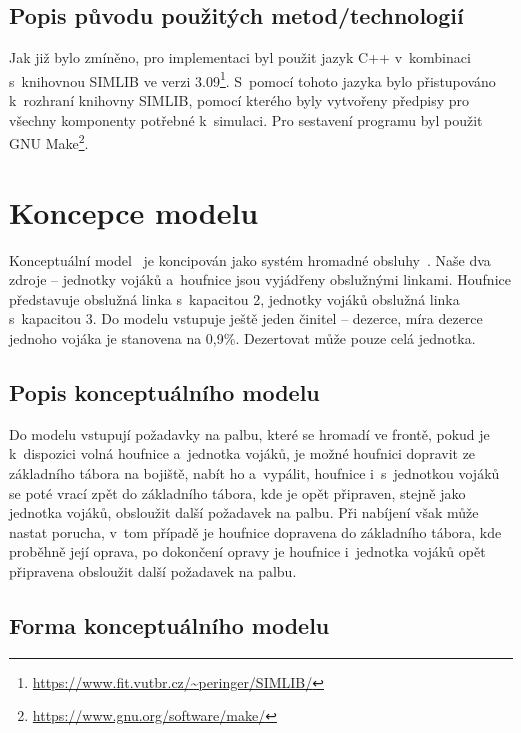 \documentclass[a4paper]{article}
\begin{document}
        \subsection{Popis původu použitých metod/technologií}
        \label{subsec:techology}

            Jak již bylo zmíněno, pro implementaci byl použit jazyk C++ v~kombinaci s~knihovnou SIMLIB ve verzi 3.09\footnote{\url{https://www.fit.vutbr.cz/~peringer/SIMLIB/}}. S~pomocí tohoto jazyka
            bylo přistupováno k~rozhraní knihovny SIMLIB, pomocí kterého byly vytvořeny předpisy pro všechny komponenty potřebné k~simulaci.
            Pro sestavení programu byl použit GNU Make\footnote{\url{https://www.gnu.org/software/make/}}.

    \section{Koncepce modelu}
    \label{sec:concept}

        Konceptuální model~\cite[snímek 48]{IMS_slides} je koncipován jako systém hromadné obsluhy~\cite[snímek 136]{IMS_slides}.
        Naše dva zdroje -- jednotky vojáků a~houfnice jsou vyjádřeny obslužnými linkami. Houfnice představuje obslužná linka s~kapacitou 2,
        jednotky vojáků obslužná linka s~kapacitou 3. Do modelu vstupuje ještě jeden činitel -- dezerce, míra dezerce jednoho vojáka je stanovena na 0,9\%.
        Dezertovat může pouze celá jednotka.

        \subsection{Popis konceptuálního modelu}
        \label{subsec:conceptual_model_description}

            Do modelu vstupují požadavky na palbu, které se hromadí ve frontě, pokud je k~dispozici volná houfnice a~jednotka vojáků,
            je možné houfnici dopravit ze základního tábora na bojiště, nabít ho a~vypálit, houfnice i~s~jednotkou vojáků se poté vrací zpět do základního tábora,
            kde je opět připraven, stejně jako jednotka vojáků, obsloužit další požadavek na palbu.
            Při nabíjení však může nastat porucha, v~tom případě je houfnice dopravena do základního tábora, kde proběhně její oprava,
            po dokončení opravy je houfnice i~jednotka vojáků opět připravena obsloužit další požadavek na palbu.

        \subsection{Forma konceptuálního modelu}
        \label{subsec:conceptual_model}
\end{document}

